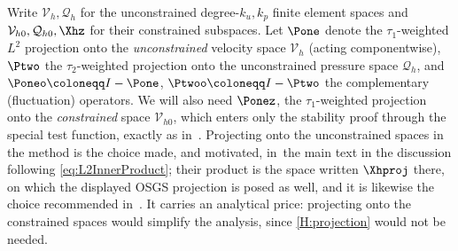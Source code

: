Write $\mathcal{V}_h, \mathcal{Q}_h$ for the unconstrained degree{\hyp}$k_u,k_p$ finite element spaces and
$\mathcal{V}_{h0}, \mathcal{Q}_{h0}, \Xhz$ for their constrained subspaces. Let $\Pone$ denote the $\tau_1$-weighted $L^2$
projection onto the \emph{unconstrained} velocity space $\mathcal{V}_h$ (acting componentwise), $\Ptwo$ the
$\tau_2$-weighted projection onto the unconstrained pressure space $\mathcal{Q}_h$, and
$\Poneo \coloneqq I - \Pone$, $\Ptwoo \coloneqq I - \Ptwo$ the complementary
(fluctuation) operators. We will also need $\Ponez$, the $\tau_1$-weighted projection
onto the \emph{constrained} space $\mathcal{V}_{h0}$, which enters only the stability proof
through the special test function, exactly as in~\cite{codina2008analysis}. Projecting onto the
unconstrained spaces in the method is the choice made, and motivated, in~the main text in
the discussion following \cref{eq:L2InnerProduct}; their product is the space written
$\Xhproj$ there, on which the displayed OSGS projection is posed as well, and it is likewise
the choice recommended in~\cite[Remark~1]{codina2008analysis}. It carries an analytical
price: projecting onto the constrained spaces would simplify the analysis, since
\cref{H:projection} would not be needed.

